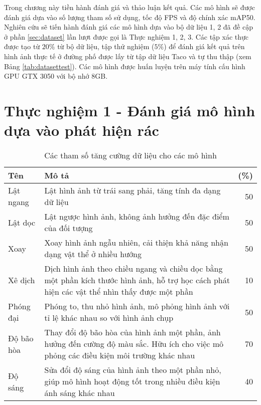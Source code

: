 \documentclass[../the.tex]{subfiles}
\begin{document}
{\fontsize{13}{12} \selectfont
Trong chương này tiền hành đánh giá và thảo luận kết quả. Các mô hình sẽ được đánh giá dựa vào số lượng tham số sử dụng, tốc độ FPS và độ chính xác mAP50.
Nghiên cứu sẽ tiến hành đánh giá các mô hình dựa vào bộ dữ liệu 1, 2 đã đề cập ở phần \ref{sec:dataset} lần lượt được gọi là Thực nghiệm 1, 2, 3.
Các tập xác thực được tạo từ $20\%$ từ bộ dữ liệu, tập thử nghiệm ($5\%$) để đánh giá kết quả trên hình ảnh thực tế ở đường phố được lấy từ tập dữ liệu Taco và tự thu thập (xem Bảng \ref{tab:datasettest}).
Các mô hình được huấn luyện trên máy tính cấu hình GPU GTX 3050 với bộ nhớ 8GB.

}

\section{Thực nghiệm 1 - Đánh giá mô hình dựa vào phát hiện rác}
\begin{table}[ht!]
    \centering
    \caption{Các tham số tăng cường dữ liệu cho các mô hình}
    \begin{tabular}{|l|p{7cm}|r|}
        \hline
        \textbf{Tên}
                   & \textbf{Mô tả}
                   & \textbf{(\%)}
        \\ \hline
        Lật ngang  & Lật hình ảnh từ trái sang phải, tăng tính đa dạng dữ liệu                                                                                    & 50 \\  \hline
        Lật dọc    & Lật ngược hình ảnh, không ảnh hưởng đến đặc điểm của đối tượng                                                                               & 50 \\  \hline
        Xoay       & Xoay hình ảnh ngẫu nhiên, cải thiện khả năng nhận dạng vật thể ở nhiều hướng                                                                 & 50 \\  \hline
        Xê dịch    & Dịch hình ảnh theo chiều ngang và chiều dọc bằng một phần kích thước hình ảnh, hỗ trợ học cách phát hiện các vật thể nhìn thấy được một phần & 10 \\  \hline
        Phóng đại  & Phóng to, thu nhỏ hình ảnh, mô phỏng hình ảnh với tỉ lệ khác nhau so với hình ảnh chụp                                                       & 50 \\  \hline
        Độ bão hòa & Thay đổi độ bão hòa của hình ảnh một phần, ảnh hưởng đến cường độ màu sắc. Hữu ích cho việc mô phỏng các điều kiện môi trường khác nhau      & 70 \\ \hline
        Độ sáng    & Sửa đổi độ sáng của hình ảnh theo một phần nhỏ, giúp mô hình hoạt động tốt trong nhiều điều kiện ánh sáng khác nhau                          & 40 \\ \hline
    \end{tabular}
    \label{tab:thamso}
\end{table}
\end{document}
